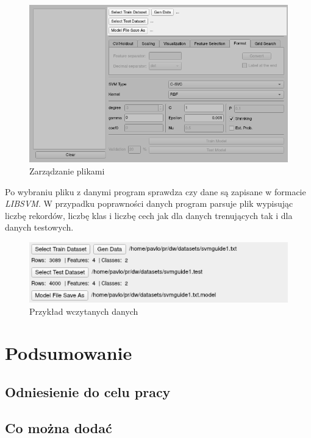 \documentclass[paper=a4, fontsize=11pt]{scrartcl} %
\numberwithin{equation}{section} %
\numberwithin{figure}{section} %
\begin{document}
\begin{enumerate}
    \begin{figure}[h]
        \begin{center}
            \includegraphics[scale=0.7]{./img/svm_app_mainw_filehandler.png}
            \caption{Zarządzanie plikami}
            \label{fig:file_handler}
        \end{center}
    \end{figure}

    \par Po wybraniu pliku z danymi program sprawdza czy dane są zapisane w formacie
    \textit{LIBSVM}. W przypadku poprawności danych program parsuje plik wypisując liczbę
    rekordów, liczbę klas i liczbę cech jak dla danych trenujących tak i dla danych testowych.

    \begin{figure}[h]
        \begin{center}
            \includegraphics[scale=0.7]{./img/svm_app_mainw_filehandler_ex.png}
            \caption{Przykład wczytanych danych}
            \label{fig:files_example1}
        \end{center}
    \end{figure}

    \end{enumerate}

\newpage
\section{Podsumowanie} %
\subsection{Odniesienie do celu pracy}
\subsection{Co można dodać}

\newpage
\nocite{*}
\printbibliography
\end{document}
